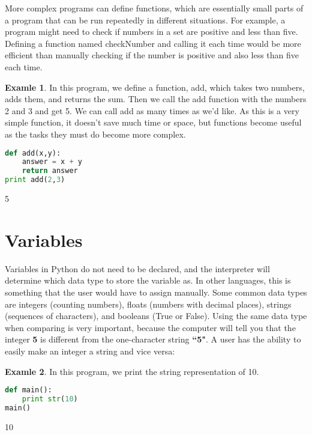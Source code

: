 \documentclass[12pt,openany]{book} %
\theoremstyle{definition}
\newtheorem{soln}{\textbf{Exam\smash{p}le} \nolinebreak }[section]
\newcounter{code}[section]
\begin{document}
 More complex programs can define functions, which are essentially small parts of a program that can be run repeatedly in different situations. For example, a program might need to check if numbers in a set are positive and less than five. Defining a function named checkNumber and calling it each time would be more efficient than manually checking if the number is positive and also less than five each time. 
 \begin{soln}  In this program, we define a function, add, which takes two numbers, adds them, and returns the sum.  Then we call the add function with the numbers 2 and 3 and get 5. We can call add as many times as we'd like. As this is a very simple function, it doesn't save much time or space, but functions become useful as the tasks they must do become more complex.  \end{soln}
\begin{code}{}{}  
\begin{lstlisting}[language=Python]
def add(x,y):
    answer = x + y
    return answer
print add(2,3)
\end{lstlisting} \end{code}
\begin{out}{}{} 5 \end{out} 
 

\section{Variables}
Variables in Python do not need to be declared, and the interpreter will determine which data type to store the variable as. In other languages, this is something that the user would have to assign manually. Some common data types are integers (counting numbers), floats (numbers with decimal places), strings (sequences of characters), and booleans (True or False). Using the same data type when comparing is very important, because the computer will tell you that the integer \textbf{5} is different from the one-character string \textbf{``5"}. A user has the ability to easily make an integer a string and vice versa:
\begin{soln}  In this program, we print the string representation of 10.   \end{soln} 
\begin{code}{}{} \begin{lstlisting}[language=Python]
def main():
    print str(10)
main()
\end{lstlisting} \end{code}
\begin{out}{}{} 10 \end{out} 
\end{document}
